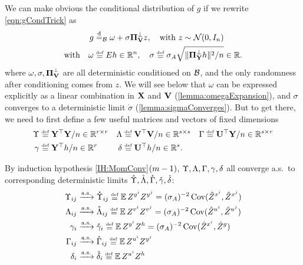 \documentclass[main.tex]{subfiles}
\begin{document}
We can make obvious the conditional distribution of $g$ if we rewrite \cref{eqn:gCondTrick} as
\begin{align}
  g &\disteq_\Bb \omega + \sigma \PP_{\Vme}^\perp z,\quad \text{with $z \sim \Gaus(0, I_n)$}
  \label{eqn:gConditionedOnB}
  \\
  \text{with}\quad
  \omega
  &\defeq
      E h \in \R^n,
      \quad
  \sigma \defeq
    \sigma_A
  \sqrt{\|\PP_{\Yme}^\perp h\|^2/n} \in \R
  .
  \label{eqn:meanvardef}
\end{align}
where $\omega, \sigma, \boldsymbol{\Pi}_{\mathbf{V}}^\perp$ are all deterministic conditioned on $\mathcal{B}$, and the only randomness after conditioning comes from $z$.
We will see below that $\omega$ can be expressed explicitly as a linear combination in $\mathbf{X}$ and $\mathbf{V}$ (\cref{lemma:omegaExpansion}), and $\sigma$ converges to a deterministic limit $\mathring\sigma$ (\cref{lemma:sigmaConverges}).
But to get there, we need to first define a few useful matrices and vectors of fixed dimensions
\begin{equation}
\begin{aligned}
    \Upsilonme 
        &\defeq
            \Yme^\trsp \Yme/n \in \R^{r \times r}
            &
    \Lambdame 
        &\defeq
            \Vme^\trsp \Vme/n \in \R^{s \times s}
            &
    \Gamma
        &\defeq
            \Ume^\trsp \Yme/n \in \R^{s \times r}
            \\
    \gammame
        &\defeq
            \Yme^\trsp h/n \in \R^{r}
            &
    \deltame
        &\defeq
            \Ume^\trsp h /n \in \R^s
            .
\end{aligned}
    \label{eqn:momentMatrices}
\end{equation}

By induction hypothesis \ref{IH:MomConv}$(m-1)$, $\Upsilon , \Lambda , \Gamma, \gamma, \delta$ all converge a.s.\ to corresponding deterministic limits $\mathring{\Upsilon }, \mathring{\Lambda }, \mathring \Gamma, \mathring{\gamma}, \mathring{\delta}$:
\begin{equation}
\begin{aligned}
  \Upsilonme_{ij}
    &\asto
      \mathring{\Upsilonme }_{ij}
    \defeq
      \EV  Z^{\yme^i}  Z^{\yme^j}
    =
      (\sigma_A)^{-2} 
      \Cov(\Zhat^{\xme^i}, \Zhat^{\xme^j})
      \\
    \Lambdame_{ij}
      &\asto
        \mathring{\Lambdame }_{ij}
      \defeq
        \EV  Z^{\vme^i}  Z^{\vme^j}
      =
        (\sigma_A)^{-2} \Cov(\Zhat^{\ume^{i}}, \Zhat^{\ume^{j}})
      \\
  \gammame_i
    &\asto
      \mathring{\gammame}_i
    \defeq
      \EV  Z^{\yme^i} Z^h
    =
      (\sigma_A)^{-2} \Cov(\Zhat^{\xme^i}, \Zhat^{g})
      \\
  \Gamma_{ij}
    &\asto
      \mathring \Gamma_{ij}
    \defeq
      \EV  Z^{\ume^i} Z^{\yme^j}
      \\
  \deltame_i
    &\asto
      \mathring{\deltame}_i
    \defeq
      \EV  Z^{\ume^i} Z^h
\end{aligned}
\label{eqn:limitMatrices}
\end{equation}
\end{document}
